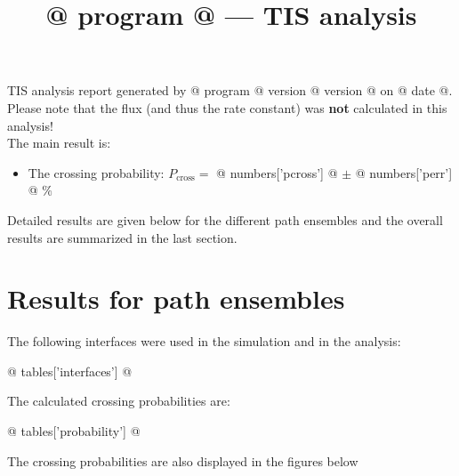 \documentclass[a4paper]{article}
\title{@{{ program }}@ --- TIS analysis}
\author{}
\date{}
\begin{document}
\maketitle
\noindent TIS analysis report generated by @{{ program }}@ version @{{ version }}@
on @{{ date }}@.
\\
\noindent Please note that the flux (and thus the rate constant)
was \textbf{not} calculated in this analysis!
\\
\noindent The main result is:
\begin{itemize}
\item The crossing probability:
$P_{\text{cross}} =$ \colorbox{blue!30}{ @{{ numbers['pcross'] }}@ }  $\pm$ @{{ numbers['perr'] }}@ $\%$
\end{itemize}
\noindent Detailed results are given below for the different path
ensembles and the overall results are summarized
in the last section.
\section{Results for path ensembles}
The following interfaces were used in the simulation and in
the analysis:

@{{ tables['interfaces'] }}@

The calculated crossing probabilities are:

@{{ tables['probability'] }}@

The crossing probabilities are also displayed in the figures below
\end{document}
